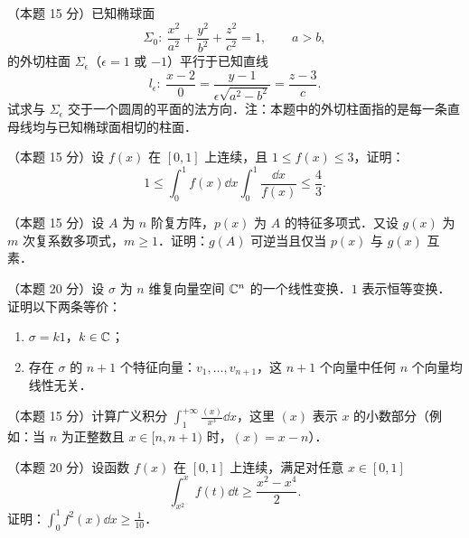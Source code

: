 
\begin{problems}
\item[一、]（本题 15 分）已知椭球面
\[
  \Sigma_{0}:\ \frac{x^{2}}{a^{2}}+\frac{y^{2}}{b^{2}}+\frac{z^{2}}{c^{2}}=1,\qquad a>b,
\]
的外切柱面 $\Sigma_{\epsilon}$（$\epsilon=1$ 或 $-1$）平行于已知直线
\[
  l_{\epsilon}:\ \frac{x-2}{0}=\frac{y-1}{\epsilon\sqrt{a^{2}-b^{2}}}=\frac{z-3}{c}.
\]
试求与 $\Sigma_{\epsilon}$ 交于一个圆周的平面的法方向．注：本题中的外切柱面指的是每一条直母线均与已知椭球面相切的柱面．

\item[二、]（本题 15 分）设 $f(x)$ 在 $[0,1]$ 上连续，且 $1\le f(x)\le 3$，证明：
\[
  1\le\int_{0}^{1}f(x)\dd x\int_{0}^{1}\frac{\dd x}{f(x)}\le\frac{4}{3}.
\]

\item[三、]（本题 15 分）设 $A$ 为 $n$ 阶复方阵，$p(x)$ 为 $A$ 的特征多项式．又设 $g(x)$ 为 $m$ 次复系数多项式，$m\ge 1$．证明：$g(A)$ 可逆当且仅当 $p(x)$ 与 $g(x)$ 互素．

\item[四、]（本题 20 分）设 $\sigma$ 为 $n$ 维复向量空间 $\mathbb{C}^{n}$ 的一个线性变换．$1$ 表示恒等变换．证明以下两条等价：
\begin{enumerate}[label=(\arabic*)]
  \item $\sigma=k1$，$k\in\mathbb{C}$；
  \item 存在 $\sigma$ 的 $n+1$ 个特征向量：$v_{1},\dots,v_{n+1}$，这 $n+1$ 个向量中任何 $n$ 个向量均线性无关．
\end{enumerate}

\item[五、]（本题 15 分）计算广义积分 $\displaystyle\int_{1}^{+\infty}\frac{(x)}{x^{3}}\dd x$，这里 $(x)$ 表示 $x$ 的小数部分（例如：当 $n$ 为正整数且 $x\in[n,n+1)$ 时，$(x)=x-n$）．

\item[六、]（本题 20 分）设函数 $f(x)$ 在 $[0,1]$ 上连续，满足对任意 $x\in[0,1]$
\[
  \int_{x^{2}}^{x}f(t)\dd t\ge\frac{x^{2}-x^{4}}{2}.
\]
证明：$\displaystyle\int_{0}^{1}f^{2}(x)\dd x\ge\frac{1}{10}$．
\end{problems}

